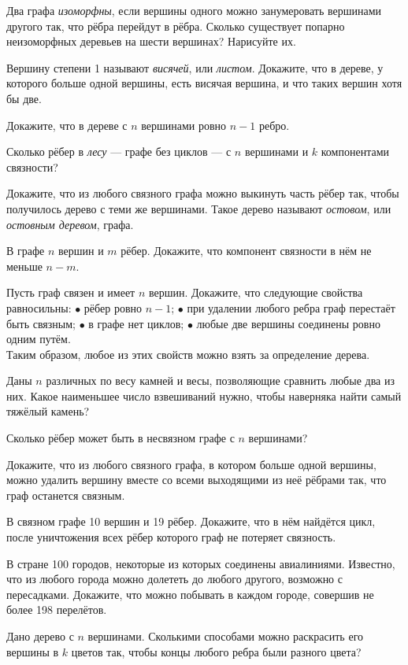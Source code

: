 \problem Два графа \textit{изоморфны}, если вершины одного можно занумеровать вершинами другого так, что рёбра перейдут в рёбра. Сколько существует попарно неизоморфных деревьев на шести вершинах? Нарисуйте их.

\problem Вершину степени 1 называют \textit{висячей}, или \textit{листом}. Докажите, что в дереве, у которого больше одной вершины, есть висячая вершина, и что таких вершин хотя бы две.

\problem Докажите, что в дереве с $n$ вершинами ровно $n-1$ ребро.

\problem Сколько рёбер в \textit{лесу} — графе без циклов — с $n$ вершинами и $k$ компонентами связности?

\problem Докажите, что из любого связного графа можно выкинуть часть рёбер так, чтобы получилось дерево с теми же вершинами. Такое дерево называют \textit{остовом}, или \textit{остовным деревом}, графа.

\problem В графе $n$ вершин и $m$ рёбер. Докажите, что компонент связности в нём не меньше $n-m$.

\problem Пусть граф связен и имеет $n$ вершин. Докажите, что следующие свойства равносильны: $\bullet$ рёбер ровно $n-1$; $\bullet$ при удалении любого ребра граф перестаёт быть связным; $\bullet$ в графе нет циклов; $\bullet$ любые две вершины соединены ровно одним путём.\\
Таким образом, любое из этих свойств можно взять за определение дерева.

\problem Даны $n$ различных по весу камней и весы, позволяющие сравнить любые два из них. Какое наименьшее число взвешиваний нужно, чтобы наверняка найти самый тяжёлый камень?

\problem Сколько рёбер может быть в несвязном графе с $n$ вершинами?

\problem Докажите, что из любого связного графа, в котором больше одной вершины, можно удалить вершину вместе со всеми выходящими из неё рёбрами так, что граф останется связным.

\problem В связном графе 10 вершин и 19 рёбер. Докажите, что в нём найдётся цикл, после уничтожения всех рёбер которого граф не потеряет связность.

\problem В стране 100 городов, некоторые из которых соединены авиалиниями. Известно, что из любого города можно долететь до любого другого, возможно с пересадками. Докажите, что можно побывать в каждом городе, совершив не более 198 перелётов.

\problem Дано дерево с $n$ вершинами. Сколькими способами можно раскрасить его вершины в $k$ цветов так, чтобы концы любого ребра были разного цвета?

